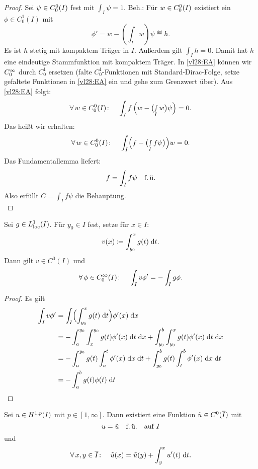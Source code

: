 \begin{proof}
    Sei $\psi\in\Coo(I)$ fest mit $\int_I \psi = 1$. Beh.: Für $w\in\Coo(I)$
    existiert ein $\phi\in C_0^1(I)$ mit
    \[ \phi' = w - \left( \int_I w \right) \psi \eqdef h . \]
    Es ist $h$ stetig mit kompaktem Träger in $I$. Außerdem gilt $\int_I h = 0$.
    Damit hat $h$ eine eindeutige Stammfunktion mit kompaktem Träger. In
    \eqref{vl28:EA} können wir $\Cinfo$ durch $C_0^1$ ersetzen (falte
    $C_0^1$-Funktionen mit Standard-Dirac-Folge, setze gefaltete Funktionen
    in \eqref{vl28:EA} ein und gehe zum Grenzwert über). Aus \eqref{vl28:EA}
    folgt:
    \[ \forall\,w\in\Coo(I)\colon\quad
        \int_I f \, \Bigl( w - \bigl( \smallint_I w \bigr) \psi \Bigr) = 0
    . \]
    Das heißt wir erhalten:
    \[ \forall\,w\in\Coo(I)\colon\quad
        \int_I \Bigl( f - \bigl( \smallint_I f \psi \bigr) \Bigr) w = 0
    . \]
    Das Fundamentallemma liefert:
    \[ f = \int_I f \psi \mfu  \]
    Also erfüllt $C = \int_I f \psi$ die Behauptung.
    \\
\end{proof}

\begin{thLemma}
    Sei $g\in\Lploc1(I)$. Für $y_0\in I$ fest, setze für $x\in I$:
    \[ v(x) \defeq \int_{y_0}^x g(t) \dif{t}  . \]
    Dann gilt $v\in C^0(I)$ und
    \[ \forall\,\phi\in\Cinfo(I)\colon\quad
        \int_I v\phi' = -\int_I g\phi
    . \]
\end{thLemma}

\begin{proof}
    Es gilt
    \begin{align*}
        \int_I v\phi'
        &= \int_I \Bigl( \int_{y_0}^x g(t) \dif{t} \Bigr) \phi'(x) \dif{x}
        \\
        &= -\int_a^{y_0} \int_x^{y_0} g(t) \phi'(x) \dif{t} \dif{x}
         + \int_{y_0}^b \int_{y_0}^x g(t) \phi'(x) \dif{t} \dif{x}
        \\
        &= %
        -\int_a^{y_0} g(t) \int_a^t \phi'(x) \dif{x} \dif{t}
        + \int_{y_0}^b g(t) \int_t^b \phi'(x) \dif{x} \dif{t}
        \\
        &= %
        - \int_a^b g(t) \phi(t) \dif{t}
    \end{align*}
\end{proof}

\begin{thTheorem}
    Sei $u\in\SobHI$ mit $p\in[1,\infty]$. Dann existiert eine Funktion
    $\tilde u\in C^0(\setclosure{I})$ mit
    \[ u = \tilde u \mfu \text{\quad auf $I$} \]
    und
    \[ \forall\,x,y\in\setclosure{I}\colon\quad
        \tilde u(x) = \tilde u(y) + \int_y^x u'(t) \dif{t}
    . \]
\end{thTheorem}

